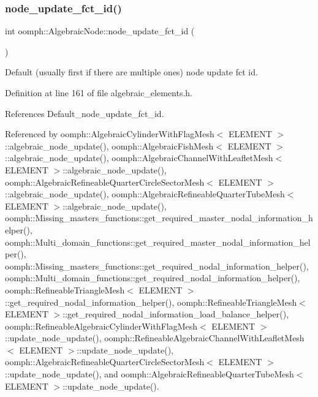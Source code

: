 \subsubsection{\texorpdfstring{node\+\_\+update\+\_\+fct\+\_\+id()}{node\_update\_fct\_id()}\hspace{0.1cm}{\footnotesize\ttfamily [1/2]}}
{\footnotesize\ttfamily int oomph\+::\+Algebraic\+Node\+::node\+\_\+update\+\_\+fct\+\_\+id (\begin{DoxyParamCaption}{ }\end{DoxyParamCaption})\hspace{0.3cm}{\ttfamily [inline]}}



Default (usually first if there are multiple ones) node update fct id. 



Definition at line 161 of file algebraic\+\_\+elements.\+h.



References Default\+\_\+node\+\_\+update\+\_\+fct\+\_\+id.



Referenced by oomph\+::\+Algebraic\+Cylinder\+With\+Flag\+Mesh$<$ E\+L\+E\+M\+E\+N\+T $>$\+::algebraic\+\_\+node\+\_\+update(), oomph\+::\+Algebraic\+Fish\+Mesh$<$ E\+L\+E\+M\+E\+N\+T $>$\+::algebraic\+\_\+node\+\_\+update(), oomph\+::\+Algebraic\+Channel\+With\+Leaflet\+Mesh$<$ E\+L\+E\+M\+E\+N\+T $>$\+::algebraic\+\_\+node\+\_\+update(), oomph\+::\+Algebraic\+Refineable\+Quarter\+Circle\+Sector\+Mesh$<$ E\+L\+E\+M\+E\+N\+T $>$\+::algebraic\+\_\+node\+\_\+update(), oomph\+::\+Algebraic\+Refineable\+Quarter\+Tube\+Mesh$<$ E\+L\+E\+M\+E\+N\+T $>$\+::algebraic\+\_\+node\+\_\+update(), oomph\+::\+Missing\+\_\+masters\+\_\+functions\+::get\+\_\+required\+\_\+master\+\_\+nodal\+\_\+information\+\_\+helper(), oomph\+::\+Multi\+\_\+domain\+\_\+functions\+::get\+\_\+required\+\_\+master\+\_\+nodal\+\_\+information\+\_\+helper(), oomph\+::\+Missing\+\_\+masters\+\_\+functions\+::get\+\_\+required\+\_\+nodal\+\_\+information\+\_\+helper(), oomph\+::\+Multi\+\_\+domain\+\_\+functions\+::get\+\_\+required\+\_\+nodal\+\_\+information\+\_\+helper(), oomph\+::\+Refineable\+Triangle\+Mesh$<$ E\+L\+E\+M\+E\+N\+T $>$\+::get\+\_\+required\+\_\+nodal\+\_\+information\+\_\+helper(), oomph\+::\+Refineable\+Triangle\+Mesh$<$ E\+L\+E\+M\+E\+N\+T $>$\+::get\+\_\+required\+\_\+nodal\+\_\+information\+\_\+load\+\_\+balance\+\_\+helper(), oomph\+::\+Refineable\+Algebraic\+Cylinder\+With\+Flag\+Mesh$<$ E\+L\+E\+M\+E\+N\+T $>$\+::update\+\_\+node\+\_\+update(), oomph\+::\+Refineable\+Algebraic\+Channel\+With\+Leaflet\+Mesh$<$ E\+L\+E\+M\+E\+N\+T $>$\+::update\+\_\+node\+\_\+update(), oomph\+::\+Algebraic\+Refineable\+Quarter\+Circle\+Sector\+Mesh$<$ E\+L\+E\+M\+E\+N\+T $>$\+::update\+\_\+node\+\_\+update(), and oomph\+::\+Algebraic\+Refineable\+Quarter\+Tube\+Mesh$<$ E\+L\+E\+M\+E\+N\+T $>$\+::update\+\_\+node\+\_\+update().

